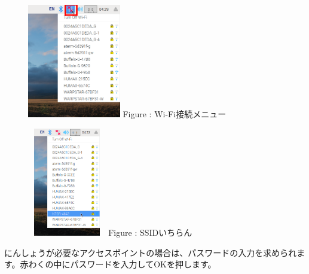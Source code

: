 \documentclass[a4paper,12pt]{jarticle}
\begin{document}
\begin{figure}[h]
  \centering
  \begin{minipage}{6.597cm}
    {\upshape
      \includegraphics[width=4.068cm,height=4.987cm]{textbook-img024.png}
      \newline
      Figure {\theFigure\label{seq:refFigure10}}: Wi-Fi接続メニュー}
  \end{minipage}
  \begin{minipage}{5.957cm}
    {\upshape
      \includegraphics[width=3.427cm,height=4.738cm]{textbook-img023.png}
      \newline
      Figure {\theFigure\label{seq:refFigure9}}: SSIDいちらん}
  \end{minipage}
\end{figure}
にんしょうが必要なアクセスポイントの場合は、パスワードの入力を求められます。赤わくの中にパスワードを入力してOKを押します。
\end{document}
